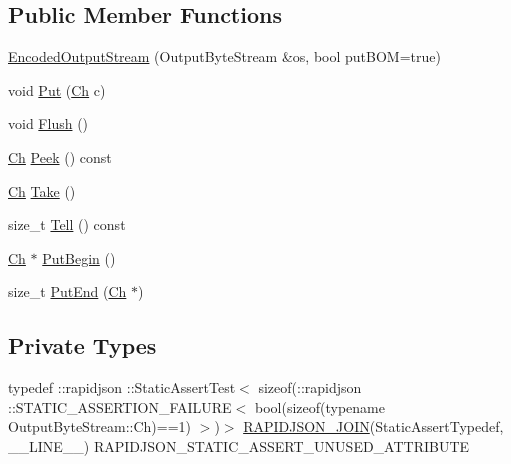 \subsection*{Public Member Functions}
\begin{DoxyCompactItemize}
\item 
\mbox{\hyperlink{classrapidjson_1_1_encoded_output_stream_a1ac9766d0a88f3913762e51512cc90e1}{Encoded\+Output\+Stream}} (Output\+Byte\+Stream \&os, bool put\+B\+OM=true)
\item 
void \mbox{\hyperlink{classrapidjson_1_1_encoded_output_stream_afe815c555bae4a46cc0c119b695b9d31}{Put}} (\mbox{\hyperlink{classrapidjson_1_1_encoded_output_stream_aa96ac761f570fbdbcc2375ad4edd8b6f}{Ch}} c)
\item 
void \mbox{\hyperlink{classrapidjson_1_1_encoded_output_stream_a725ecc2947f20d49b8dc0baf93929923}{Flush}} ()
\item 
\mbox{\hyperlink{classrapidjson_1_1_encoded_output_stream_aa96ac761f570fbdbcc2375ad4edd8b6f}{Ch}} \mbox{\hyperlink{classrapidjson_1_1_encoded_output_stream_a8f7a07f454334646a679afa49c930e8e}{Peek}} () const
\item 
\mbox{\hyperlink{classrapidjson_1_1_encoded_output_stream_aa96ac761f570fbdbcc2375ad4edd8b6f}{Ch}} \mbox{\hyperlink{classrapidjson_1_1_encoded_output_stream_a27f733fa1ba8b35b4fddd2a569ac4ba1}{Take}} ()
\item 
size\+\_\+t \mbox{\hyperlink{classrapidjson_1_1_encoded_output_stream_accd11ac295fedffb5398546fca7138c2}{Tell}} () const
\item 
\mbox{\hyperlink{classrapidjson_1_1_encoded_output_stream_aa96ac761f570fbdbcc2375ad4edd8b6f}{Ch}} $\ast$ \mbox{\hyperlink{classrapidjson_1_1_encoded_output_stream_af5d5dbcd275de9c9a565f8e01a9cf559}{Put\+Begin}} ()
\item 
size\+\_\+t \mbox{\hyperlink{classrapidjson_1_1_encoded_output_stream_a6739a8fb953962998438c636ff9f05a3}{Put\+End}} (\mbox{\hyperlink{classrapidjson_1_1_encoded_output_stream_aa96ac761f570fbdbcc2375ad4edd8b6f}{Ch}} $\ast$)
\end{DoxyCompactItemize}
\subsection*{Private Types}
\begin{DoxyCompactItemize}
\item 
typedef \+::rapidjson \+::Static\+Assert\+Test$<$ sizeof(\+::rapidjson \+::S\+T\+A\+T\+I\+C\+\_\+\+A\+S\+S\+E\+R\+T\+I\+O\+N\+\_\+\+F\+A\+I\+L\+U\+RE$<$ bool(sizeof(typename Output\+Byte\+Stream\+::\+Ch)==1) $>$)$>$ \mbox{\hyperlink{classrapidjson_1_1_encoded_output_stream_af2588d1187d4bca384a37f5699542ba6}{R\+A\+P\+I\+D\+J\+S\+O\+N\+\_\+\+J\+O\+IN}}(Static\+Assert\+Typedef, \+\_\+\+\_\+\+L\+I\+N\+E\+\_\+\+\_\+) R\+A\+P\+I\+D\+J\+S\+O\+N\+\_\+\+S\+T\+A\+T\+I\+C\+\_\+\+A\+S\+S\+E\+R\+T\+\_\+\+U\+N\+U\+S\+E\+D\+\_\+\+A\+T\+T\+R\+I\+B\+U\+TE
\end{DoxyCompactItemize}
